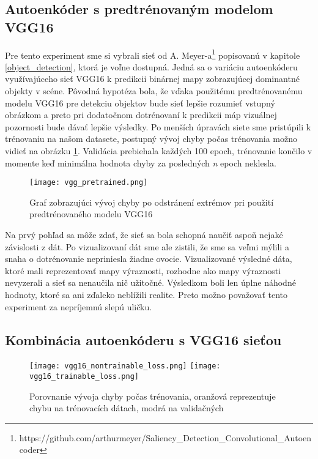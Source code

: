 \subsection{Autoenkóder s predtrénovaným modelom VGG16}
\label{experiments_vgg_net}

Pre tento experiment sme si vybrali sieť od A. Meyer-a\footnote{https://github.com/arthurmeyer/Saliency\_Detection\_Convolutional\_Autoencoder} popisovanú v kapitole \ref{object_detection}, ktorá je voľne dostupná. Jedná sa o variáciu autoenkóderu využívajúceho sieť VGG16 k predikcii binárnej mapy zobrazujúcej dominantné objekty v scéne. Pôvodná hypotéza bola, že vďaka použitému predtrénovanému modelu VGG16 pre detekciu objektov bude sieť lepšie rozumieť vstupný obrázkom a preto pri dodatočnom dotrénovaní k predikcii máp vizuálnej pozornosti bude dávať lepšie výsledky. Po menších úpravách siete sme pristúpili k trénovaniu na našom datasete, postupný vývoj chyby počas trénovania možno vidieť na obrázku \ref{vgg_pretrained_loss}. Validácia prebiehala každých 100 epoch, trénovanie končilo v momente keď minimálna hodnota chyby za posledných \textit{n} epoch neklesla. 
 
\begin{figure}[H]
	\begin{center}
		\texttt{[image: vgg\_pretrained.png]}
		\caption[Vývoj chyby počas trénovanie siete s predtrénovaným modelom VGG16]{
			Graf zobrazujúci vývoj chyby po odstránení extrémov pri použití predtrénovaného modelu VGG16 
		}\label{vgg_pretrained_loss}
	\end{center}
\end{figure}

Na prvý pohľad sa môže zdať, že sieť sa bola schopná naučiť aspoň nejaké závislosti z dát. Po vizualizovaní dát sme ale zistili, že sme sa veľmi mýlili a snaha o dotrénovanie nepriniesla žiadne ovocie. Vizualizované výsledné dáta, ktoré mali reprezentovať mapy výraznosti, rozhodne ako mapy výraznosti nevyzerali a sieť sa nenaučila nič užitočné. Výsledkom boli len úplne náhodné hodnoty, ktoré sa ani zďaleko neblížili realite. Preto možno považovať tento experiment za nepríjemnú slepú uličku.

\subsection{Kombinácia autoenkóderu s VGG16 sieťou}


\begin{figure}[H]
	\begin{center}
		\texttt{[image: vgg16\_nontrainable\_loss.png]}
		\texttt{[image: vgg16\_trainable\_loss.png]}
		\caption[Porovnanie vývoja chyby predikcie počas trénovania kombinácie autoenkóderu s VGG16 sieťou]{
			Porovnanie vývoja chyby počas trénovania, oranžová reprezentuje chybu na trénovacích dátach, modrá na validačných
		}\label{vgg16_loss_trainable_vs_nontrainable}
	\end{center}
\end{figure}

